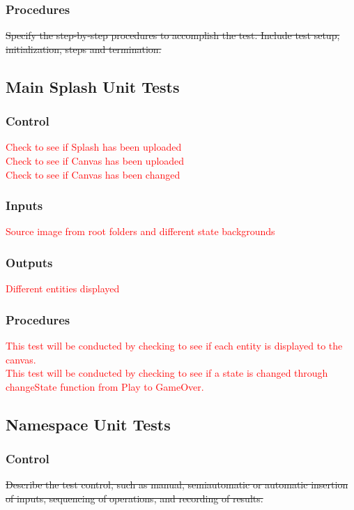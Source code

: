 \documentclass[11pt, oneside]{article}   	%
\begin{document}
\subsubsection{Procedures}
\sout{Specify the step-by-step procedures to accomplish the test. Include test setup, initialization, steps and termination.}



\subsection{Main Splash Unit Tests}
\subsubsection{Control}
\textcolor{red}{Check to see if Splash has been uploaded} \\
\textcolor{red}{Check to see if Canvas has been uploaded} \\
\textcolor{red}{Check to see if Canvas has been changed} 

\subsubsection{Inputs}
\textcolor{red}{Source image from root folders and different state backgrounds}

\subsubsection{Outputs}
\textcolor{red}{Different entities displayed}

\subsubsection{Procedures}
\textcolor{red}{This test will be conducted by checking to see if each entity is displayed to the canvas.} \\
\textcolor{red}{This test will be conducted by checking to see if a state is changed through changeState function from Play to GameOver. }


\subsection{Namespace Unit Tests}
\subsubsection{Control}
\sout{Describe the test control, such as manual, semiautomatic or automatic insertion of inputs, sequencing of operations, and recording of results.}
\end{document}

